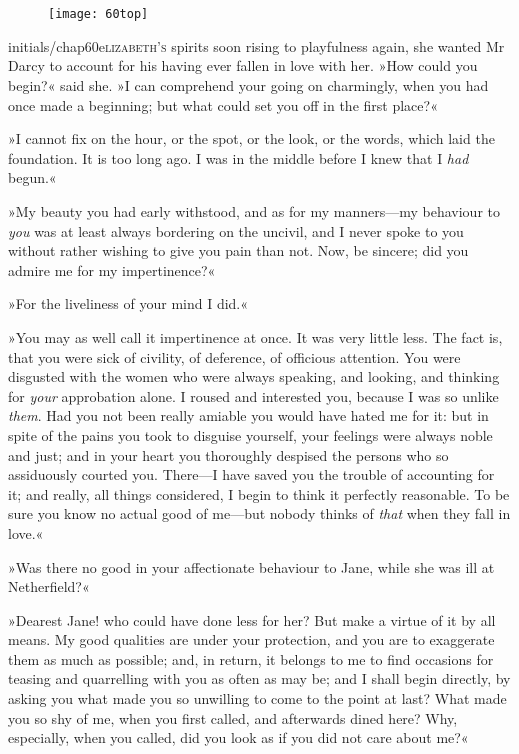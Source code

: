 \chapter[Chapter \thechapter]{}
	
\begin{figure}[t!]
\centering
\texttt{[image: 60top]}
\end{figure}


\lettrine[lines=6,image=true]{initials/chap60e}{lizabeth's} spirits soon rising to playfulness again, she wanted Mr Darcy to account for his having ever fallen in love with her. »How could you begin?« said she. »I can comprehend your going on charmingly, when you had once made a beginning; but what could set you off in the first place?«

\zz
»I cannot fix on the hour, or the spot, or the look, or the words, which laid the foundation. It is too long ago. I was in the middle before I knew that I \textit{had} begun.«

»My beauty you had early withstood, and as for my manners—my behaviour to \textit{you} was at least always bordering on the uncivil, and I never spoke to you without rather wishing to give you pain than not. Now, be sincere; did you admire me for my impertinence?«

»For the liveliness of your mind I did.«

»You may as well call it impertinence at once. It was very little less. The fact is, that you were sick of civility, of deference, of officious attention. You were disgusted with the women who were always speaking, and looking, and thinking for \textit{your} approbation alone. I roused and interested you, because I was so unlike \textit{them}. Had you not been really amiable you would have hated me for it: but in spite of the pains you took to disguise yourself, your feelings were always noble and just; and in your heart you thoroughly despised the persons who so assiduously courted you. There—I have saved you the trouble of accounting for it; and really, all things considered, I begin to think it perfectly reasonable. To be sure you know no actual good of me—but nobody thinks of \textit{that} when they fall in love.«

»Was there no good in your affectionate behaviour to Jane, while she was ill at Netherfield?«

»Dearest Jane! who could have done less for her? But make a virtue of it by all means. My good qualities are under your protection, and you are to exaggerate them as much as possible; and, in return, it belongs to me to find occasions for teasing and quarrelling with you as often as may be; and I shall begin directly, by asking you what made you so unwilling to come to the point at last? What made you so shy of me, when you first called, and afterwards dined here? Why, especially, when you called, did you look as if you did not care about me?«

